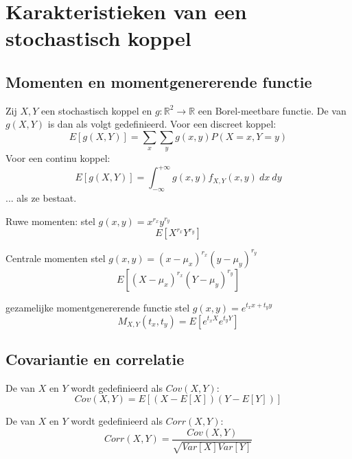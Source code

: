 \documentclass[main.tex]{subfiles}
\begin{document}
\section{Karakteristieken van een stochastisch koppel}
\label{sec:karakt-van-een}

\subsection{Momenten en momentgenererende functie}
\label{sec:moment-en-momentg}

\begin{de}
  Zij $X,Y$ een stochastisch koppel en $g: \mathbb{R}^{2} \rightarrow \mathbb{R}$ een Borel-meetbare functie.
  De  van $g(X,Y)$ is dan als volgt gedefinieerd.
  Voor een discreet koppel:
  \[ E[g(X,Y)] = \sum_{x}\sum_{y}g(x,y)P(X=x,Y=y) \]
  Voor een continu koppel:
  \[ E[g(X,Y)] = \int_{-\infty}^{+\infty}g(x,y)f_{X,Y}(x,y)\ dx\ dy \]
  ... als ze bestaat.
\end{de}

\begin{de}
  Ruwe momenten:
  stel $g(x,y) = x^{r_{x}}y^{r_{y}}$
  \[ E[X^{r_{x}}Y^{r_{y}}] \]
\end{de}

\begin{de}
  Centrale momenten
  stel $g(x,y) = (x-\mu_{x})^{r_{x}}(y-\mu_{y})^{r_{y}}$
  \[ E[(X-\mu_{x})^{r_{x}}(Y-\mu_{y})^{r_{y}}] \]
\end{de}

\begin{de}
  gezamelijke momentgenererende functie
  stel $g(x,y) = e^{t_{x}x+t_{y}y}$
  \[ M_{X,Y}(t_{x},t_{y}) = E[e^{t_{x}X}e^{t_{y}Y}] \]
\end{de}


\subsection{Covariantie en correlatie}
\label{sec:covar-en-corr}

\begin{de}
  De  van $X$ en $Y$ wordt gedefinieerd als $Cov(X,Y)$:
  \[ Cov(X,Y) = E[(X-E[X])(Y-E[Y])] \]
\end{de}


\begin{de}
  De  van $X$ en $Y$ wordt gedefinieerd als $Corr(X,Y)$:
  \[ Corr(X,Y) = \frac{Cov(X,Y)}{\sqrt{Var[X]Var[Y]}} \]
\end{de}
\end{document}
